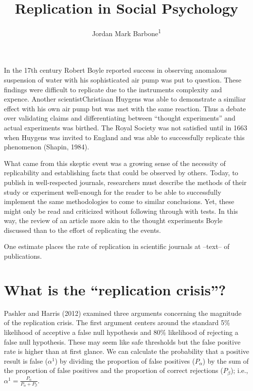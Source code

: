 \documentclass[man]{apa6}
\title{Replication in Social Psychology}
\author{Jordan Mark Barbone\textsuperscript{1}}
\date{}
\affiliation{
\vspace{0.5cm}
\textsuperscript{1} West Chester University of Pennsylvania University}
\theoremstyle{definition}
\theoremstyle{definition}
\theoremstyle{definition}
\theoremstyle{remark}
\begin{document}
\maketitle

In the 17th century Robert Boyle reported success in observing anomalous
suspension of water with his sophisticated air pump was put to question.
These findings were difficult to replicate due to the instruments
complexity and expence. Another scientistChristiaan Huygens was able to
demonstrate a similiar effect with his own air pump but was met with the
same reaction. Thus a debate over validating claims and differentiating
between \enquote{thought experiments} and actual experiments was
birthed. The Royal Society was not satisfied until in 1663 when Huygens
was invited to England and was able to successfully replicate this
phenomenon (Shapin, 1984).

What came from this skeptic event was a growing sense of the necessity
of replicability and establishing facts that could be observed by
others. Today, to publish in well-respected journals, researchers must
describe the methods of their study or experiment well-enough for the
reader to be able to successfully implement the same methodologies to
come to similar conclusions. Yet, these might only be read and
criticized without following through with tests. In this way, the review
of an article more akin to the thought experiments Boyle discussed than
to the effort of replicating the events.

One estimate places the rate of replication in scientific journals at
--text-- of publications.

\hypertarget{what-is-the-replication-crisis}{%
\section{\texorpdfstring{What is the \enquote{replication
crisis}?}{What is the ``replication crisis''?}}\label{what-is-the-replication-crisis}}

Pashler and Harris (2012) examined three arguments concerning the
magnitude of the replication crisis. The first argument centers around
the standard 5\% likelihood of acceptive a false null hypothesis and
80\% likelihood of rejecting a false null hypothesis. These may seem
like safe thresholds but the false positive rate is higher than at first
glance. We can calculate the probability that a positive result is false
(\(\alpha^1\)) by dividing the proportion of false positives
(\(P_\alpha\)) by the sum of the proportion of false positives and the
proportion of correct rejections (\(P_\beta\)); i.e.,
\(\alpha^1 = \frac{P_\alpha}{P_\alpha + P_\beta}\).
\end{document}
